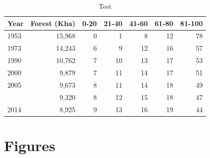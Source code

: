 \documentclass[]{article}
\theoremstyle{definition}
\theoremstyle{definition}
\theoremstyle{definition}
\theoremstyle{remark}
\begin{document}
\begin{table}

\caption{\label{tab:frag}Test}
\centering
\begin{tabular}[t]{lrrrrrr}
\toprule
Year & Forest (Kha) & 0-20 & 21-40 & 41-60 & 61-80 & 81-100\\
\midrule
1953 & 15,968 & 0 & 1 & 8 & 12 & 78\\
1973 & 14,243 & 6 & 9 & 12 & 16 & 57\\
1990 & 10,762 & 7 & 10 & 13 & 17 & 53\\
2000 & 9,879 & 7 & 11 & 14 & 17 & 51\\
2005 & 9,673 & 8 & 11 & 14 & 18 & 49\\
\addlinespace
2010 & 9,320 & 8 & 12 & 15 & 18 & 47\\
2014 & 8,925 & 9 & 13 & 16 & 19 & 44\\
\bottomrule
\end{tabular}
\end{table}

\hypertarget{figures}{%
\section{Figures}\label{figures}}
\end{document}
